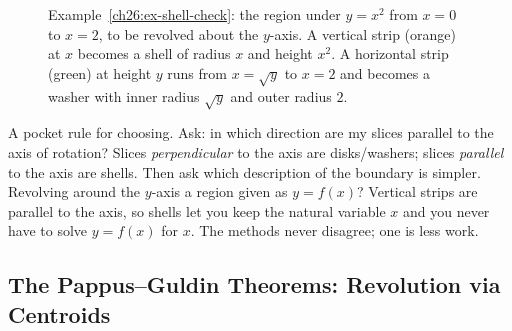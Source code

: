\begin{figure}[htbp]
\centering
{}
\caption{Example~\ref{ch26:ex-shell-check}: the region under $y=x^2$ from $x=0$ to
$x=2$, to be revolved about the $y$-axis. A vertical strip (orange) at $x$ becomes a
shell of radius $x$ and height $x^2$. A horizontal strip (green) at height $y$ runs from
$x=\sqrt y$ to $x=2$ and becomes a washer with inner radius $\sqrt y$ and outer
radius $2$.}
\label{ch26:fig-shell-washer}
\end{figure}

\begin{intuitionbox}
A pocket rule for choosing. Ask: in which direction are my slices parallel to the
axis of rotation? Slices \emph{perpendicular} to the axis are disks/washers; slices
\emph{parallel} to the axis are shells. Then ask which description of the boundary
is simpler. Revolving around the $y$-axis a region given as $y=f(x)$? Vertical
strips are parallel to the axis, so shells let you keep the natural variable $x$
and you never have to solve $y=f(x)$ for $x$. The methods never disagree; one is
less work.
\end{intuitionbox}

\subsection{The Pappus--Guldin Theorems: Revolution via Centroids}

